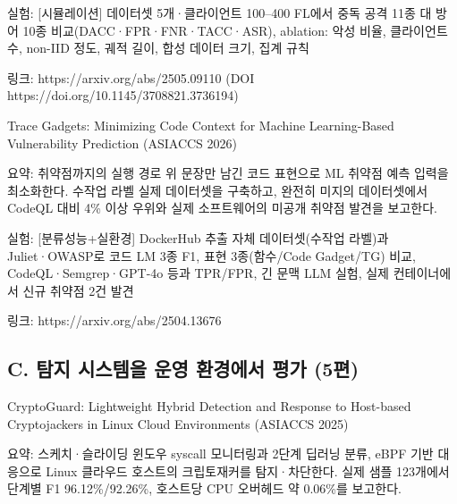 \par\noindent \textbullet\enspace 실험: [시뮬레이션] 데이터셋 5개·클라이언트 100–400 FL에서 중독 공격 11종 대 방어 10종 비교(DACC·FPR·FNR·TACC·ASR), ablation: 악성 비율, 클라이언트 수, non-IID 정도, 궤적 길이, 합성 데이터 크기, 집계 규칙


\par\noindent \textbullet\enspace 링크: https:/\allowbreak{}/\allowbreak{}arxiv.org/\allowbreak{}abs/\allowbreak{}2505.09110 (DOI https:/\allowbreak{}/\allowbreak{}doi.org/\allowbreak{}10.1145/\allowbreak{}3708821.3736194)



\par\noindent \textbullet\enspace Trace Gadgets: Minimizing Code Context for Machine Learning-Based Vulnerability Prediction (ASIACCS 2026)

\par\noindent \textbullet\enspace 요약: 취약점까지의 실행 경로 위 문장만 남긴 코드 표현으로 ML 취약점 예측 입력을 최소화한다. 수작업 라벨 실제 데이터셋을 구축하고, 완전히 미지의 데이터셋에서 CodeQL 대비 4\% 이상 우위와 실제 소프트웨어의 미공개 취약점 발견을 보고한다.


\par\noindent \textbullet\enspace 실험: [분류성능+\allowbreak{}실환경] DockerHub 추출 자체 데이터셋(수작업 라벨)과 Juliet·OWASP로 코드 LM 3종 F1, 표현 3종(함수/\allowbreak{}Code Gadget/\allowbreak{}TG) 비교, CodeQL·Semgrep·GPT-4o 등과 TPR/\allowbreak{}FPR, 긴 문맥 LLM 실험, 실제 컨테이너에서 신규 취약점 2건 발견


\par\noindent \textbullet\enspace 링크: https:/\allowbreak{}/\allowbreak{}arxiv.org/\allowbreak{}abs/\allowbreak{}2504.13676



\subsection{C. 탐지 시스템을 운영 환경에서 평가 (5편)}
\par\noindent \textbullet\enspace CryptoGuard: Lightweight Hybrid Detection and Response to Host-based Cryptojackers in Linux Cloud Environments (ASIACCS 2025)

\par\noindent \textbullet\enspace 요약: 스케치·슬라이딩 윈도우 syscall 모니터링과 2단계 딥러닝 분류, eBPF 기반 대응으로 Linux 클라우드 호스트의 크립토재커를 탐지·차단한다. 실제 샘플 123개에서 단계별 F1 96.12\%/\allowbreak{}92.26\%, 호스트당 CPU 오버헤드 약 0.06\%를 보고한다.


